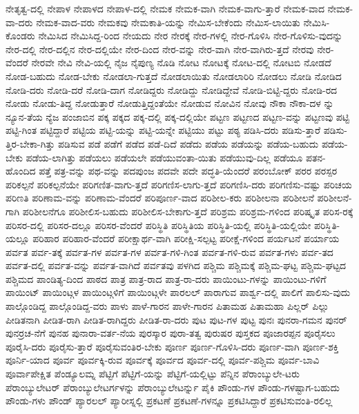 {ನೇತೃತ್ವ-ದಲ್ಲಿ
ನೇಪಾಳ
ನೇಪಾಳದ
ನೇಪಾಳ-ದಲ್ಲಿ
ನೇಮಕ
ನೇಮಕ-ವಾಗಿ
ನೇಮಕ-ವಾಗು-ತ್ತಾರೆ
ನೇಮಕ-ವಾದ
ನೇಮಕ-ವಾ-ದರು
ನೇಮಕ-ವಾದ-ವರು
ನೇಮಕವು
ನೇಮಕಾತಿ-ಯನ್ನು
ನೇಮಿಸ-ಬೇಕೆಂದು
ನೇಮಿಸ-ಲಾಯಿತು
ನೇಮಿಸಿ-ಕೊಂಡರು
ನೇಮಿಸಿದ
ನೇಮಿಸಿದ್ದ-ರಿಂದ
ನೇಯದು
ನೇರ
ನೇರಕ್ಕೆ
ನೇರ-ಗಳಲ್ಲಿ
ನೇರ-ಗೊಳಿಸಿ
ನೇರ-ಗೊಳಿಸು-ವುದನ್ನು
ನೇರ-ದಲ್ಲಿ
ನೇರ-ದಲ್ಲಿನ
ನೇರ-ದಲ್ಲಿಯೇ
ನೇರ-ದಿಂದ
ನೇರ-ವನ್ನು
ನೇರ-ವಾಗಿ
ನೇರ-ವಾಗಿರು-ತ್ತದೆ
ನೇರವು
ನೇರ-ವೆಂದರೆ
ನೇರವೇ
ನೇವಿ
ನೇವಿ-ಯಲ್ಲಿ
ನೈಜ
ನೈಪುಣ್ಯ
ನೊಡಿ
ನೋಟ
ನೋಟಕ್ಕೆ
ನೋಟ-ದಲ್ಲಿ
ನೋಟಬಿ
ನೋಡದೆ
ನೋಡ-ಬಹುದು
ನೋಡ-ಬೇಕು
ನೋಡಲಾ-ಗುತ್ತದೆ
ನೋಡಲಾಯಿತು
ನೋಡಲಾರಿರಿ
ನೋಡಲು
ನೋಡಿ
ನೋಡಿದ
ನೋಡಿ-ದರು
ನೋಡಿ-ದರೆ
ನೋಡಿ-ದಾಗ
ನೋಡಿದ್ದರು
ನೋಡಿದ್ದು
ನೋಡಿದ್ದೇವೆ
ನೋಡಿ-ಬಿಟ್ಟಿ-ದ್ದರು
ನೋಡಿ-ರದ
ನೋಡು
ನೋಡು-ತಿದ್ದ
ನೋಡುತ್ತಾರೆ
ನೋಡುತ್ತಿದ್ದಂತೆಯೇ
ನೋಡುವ
ನೋವಿನ
ನೋವು
ನೌಕಾ
ನೌಕಾ-ದಳ
ನ್ನು
ನ್ಯೂನ-ತೆಯ
ನ್ಯೆಜ
ಪಂಜಾಬಿನ
ಪಕ್ಕ
ಪಕ್ಕದ
ಪಕ್ಕ-ದಲ್ಲಿ
ಪಕ್ಕ-ದಲ್ಲಿಯೇ
ಪಟ್ಟಣ
ಪಟ್ಟಣದ
ಪಟ್ಟಣ-ವನ್ನು
ಪಟ್ಟಣವು
ಪಟ್ಟಿ
ಪಟ್ಟಿ-ಗಿಂತ
ಪಟ್ಟಿದ್ದಾರೆ
ಪಟ್ಟಿಯ
ಪಟ್ಟಿ-ಯನ್ನು
ಪಟ್ಟಿ-ಯನ್ನೇ
ಪಟ್ಟಿಯು
ಪಟ್ಟು
ಪಠ್ಯ
ಪಡಿಸಿ-ದರು
ಪಡಿಸು-ತ್ತಾರೆ
ಪಡಿಸು-ತ್ತಿರ-ಬೇಕಾ-ಗಿತ್ತು
ಪಡಿಸುವ
ಪಡೆ
ಪಡೆಗೆ
ಪಡೆದ
ಪಡೆ-ದಿದೆ
ಪಡೆದು
ಪಡೆಯ
ಪಡೆಯನ್ನು
ಪಡೆಯ-ಬಹುದು
ಪಡೆಯ-ಬೇಕು
ಪಡೆಯ-ಲಾಗಿತ್ತು
ಪಡೆಯಲು
ಪಡೆಯಲೇ
ಪಡೆಯುವಂತಾ-ಯಿತು
ಪಡೆಯುವು-ದಿಲ್ಲ
ಪಡೆಯೂ
ಪತನ-ಹೊಂದಿದ
ಪತ್ತೆ
ಪತ್ರ-ವನ್ನು
ಪಥ-ವನ್ನು
ಪದಪುಂಜ
ಪದವೇ
ಪದೇ
ಪದ್ಧತಿ-ಯೆಂದರೆ
ಪರಂಬೋಕ್
ಪರರ
ಪರಸ್ಪರ
ಪರಿಕಲ್ಪನೆ
ಪರಿಕಲ್ಪನೆಯೇ
ಪರಿಗಣಿತ-ವಾಗು-ತ್ತದೆ
ಪರಿಗಣಿಸ-ಲಾಗು-ತ್ತದೆ
ಪರಿಗಣಿಸಿ-ದರು
ಪರಿಗಣಿಸು-ವಷ್ಟು
ಪರಿಚಯ
ಪರಿಣತಿ
ಪರಿಣಾಮ-ವನ್ನು
ಪರಿಣಾಮ-ವೆಂದರೆ
ಪರಿಪೂರ್ಣ-ವಾದ
ಪರಿಶೀಲ-ಕರು
ಪರಿಶೀಲನಾ
ಪರಿಶೀಲನೆ
ಪರಿಶೀಲನೆ-ಗಾಗಿ
ಪರಿಶೀಲನೆಗೂ
ಪರಿಶೀಲಿಸ-ಬಹುದು
ಪರಿಶೀಲಿಸ-ಬೇಕಾಗು-ತ್ತದೆ
ಪರಿಶ್ರಮ
ಪರಿಶ್ರಮ-ಗಳಿಂದ
ಪರಿಷ್ಕೃತ
ಪರಿಸ-ರಕ್ಕೆ
ಪರಿಸರ-ದಲ್ಲಿ
ಪರಿಸರ-ದಲ್ಲೂ
ಪರಿಸರ-ವೆಂದರೆ
ಪರಿಸ್ಥಿತಿ
ಪರಿಸ್ಥಿತಿಯ
ಪರಿಸ್ಥಿತಿ-ಯಲ್ಲಿ
ಪರಿಸ್ಥಿತಿ-ಯಲ್ಲಿಯೇ
ಪರಿಸ್ಥಿತಿ-ಯಲ್ಲೂ
ಪರಿಹಾರ
ಪರಿಹಾರ-ವೆಂದರೆ
ಪರೀಕ್ಷಾರ್ಥ-ವಾಗಿ
ಪರೀಕ್ಷಿ-ಸಲ್ಪಟ್ಟ
ಪರೀಕ್ಷೆ-ಗಳಿಂದ
ಪರ್ಯಟನೆ
ಪರ್ಯಾಯ
ಪರ್ವತ
ಪರ್ವ-ತಕ್ಕೆ
ಪರ್ವತ-ಗಳ
ಪರ್ವತ-ಗಳ
ಪರ್ವತ-ಗಳಿ-ಗಿಂತ
ಪರ್ವತ-ಗಳಿ-ರುವ
ಪರ್ವತ-ಗಳು
ಪರ್ವ-ತದ
ಪರ್ವತ-ದಲ್ಲಿ
ಪರ್ವತ-ವನ್ನು
ಪರ್ವತ-ವಾಗಿದೆ
ಪರ್ವತವು
ಪಳಗಿದ
ಪಶ್ಚಿಮ
ಪಶ್ಚಿಮಕ್ಕೆ
ಪಶ್ಚಿಮ-ಘಟ್ಟ
ಪಶ್ಚಿಮ-ಘಟ್ಟದ
ಪಶ್ಚಿಮದ
ಪಾಂಡಿತ್ಯ-ದಿಂದ
ಪಾಠದ
ಪಾತ್ರ
ಪಾತ್ರ-ರಾದ
ಪಾತ್ರ-ರಾ-ದರು
ಪಾಯಿಂಟು-ಗಳನ್ನು
ಪಾಯಿಂಟು-ಗಳಿಗೆ
ಪಾಯಿಂಟ್
ಪಾಯಿಂಟ್ಗಳ
ಪಾಯಿಂಟ್ಗಳಿಗೆ
ಪಾಯಿಂಟ್ಗಳೇ
ಪಾರಲಲ್
ಪಾರಾಗುವ
ಪಾರ್ಶ್ವ-ದಲ್ಲಿ
ಪಾಲಿಗೆ
ಪಾಲಿಸು-ವುದು
ಪಾಲ್ಗೊಂಡಿದ್ದ
ಪಾಲ್ಗೊಂಡಿದ್ದ-ವರು
ಪಾಳು
ಪಾಳೆ-ಗಾರನ
ಪಾಳೇ-ಗಾರನ
ಪಿತಾಮಹ
ಪಿತಾಮಹಾ
ಪಿಲ್ಲರ್
ಪಿಲ್ಲು
ಪೀಡಿತನಾಗಿ
ಪೀಡಿತ-ರಾಗಿ
ಪೀಡಿತ-ರಾಗಿದ್ದರು
ಪೀಡಿತ-ರಾ-ದರು
ಪುಟ
ಪುಟ-ಗಳ
ಪುಟ್ಟ
ಪುನಃ
ಪುನರಾ-ಗಮನ
ಪುನರ್
ಪುನರ್ರಚ-ನೆಗೆ
ಪುನಹ
ಪುನಾರಾ-ವರ್ತ-ನೆಯ
ಪುರಸ್ಕಾರ
ಪುರಾ-ತತ್ವ
ಪುರುಷರ
ಪುಸ್ತಕದ
ಪೂಜಾರಪ್ಪನ
ಪೂರೈಸಲು
ಪೂರೈಸಿ-ದರು
ಪೂರೈಸು-ತ್ತಾರೆ
ಪೂರೈಸುವಂತಿರ-ಬೇಕು
ಪೂರ್ಣ
ಪೂರ್ಣ-ಗೊಳಿಸಿ-ದರು
ಪೂರ್ಣ-ವಾಗಿ
ಪೂರ್ಣ-ಶಕ್ತಿ
ಪೂರ್ನಿ-ಯಾದ
ಪೂರ್ವ
ಪೂರ್ವಕ್ಕಿ-ರುವ
ಪೂರ್ವಕ್ಕೆ
ಪೂರ್ವದ
ಪೂರ್ವ-ದಲ್ಲಿ
ಪೂರ್ವ-ಪಶ್ಚಿಮ
ಪೂರ್ವ-ಬಾವಿ
ಪೂರ್ವಾಪೇಕ್ಷಿತ
ಪೆಂಡ್ಯೂಲಮ್ನ
ಪೆಟ್ಟಿಗೆ
ಪೆಟ್ಟಿಗೆ-ಯನ್ನು
ಪೆಟ್ಟಿಗೆ-ಯಲ್ಲಿಟ್ಟು
ಪೆನ್ನಿನ
ಪೆರಾಂಬ್ಯುಲೇ-ಟರು
ಪೆರಾಂಬ್ಯುಲೇಟರ್
ಪೆರಾಂಬ್ಯುಲೇಟರ್ಗಳನ್ನು
ಪೆರಾಂಬ್ಯುಲೇಟರ್ನ್ನು
ಪೈಕಿ
ಪೌಂಡು-ಗಳ
ಪೌಂಡು-ಗಳಷ್ಟಾಗ-ಬಹುದು
ಪೌಂಡು-ಗಳು
ಪೌಂಡ್
ಪ್ಯಾರಲಲ್
ಪ್ಯಾರೀಸ್ನಲ್ಲಿ
ಪ್ರಕಟಣೆ
ಪ್ರಕಟಣೆ-ಗಳನ್ನೂ
ಪ್ರಕಟಿಸಿದ್ದಾರೆ
ಪ್ರಕಟಿಸುವಂತಿ-ರಲಿಲ್ಲ
}
